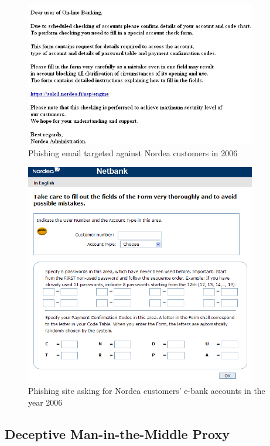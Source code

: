 \documentclass{tktltiki}
\begin{document}
          
\begin{figure}
  \centering
  \includegraphics[width=0.9\textwidth]{images/nordea_phishing_email.jpg}
  \caption{Phishing email targeted against Nordea customers in 2006}
  \label{fig:nordea_phishing_email}
\end{figure}

\begin{figure}
  \centering
  \includegraphics[width=0.9\textwidth]{images/nordea_phishing_website.png}
  \caption{Phishing site asking for Nordea customers' e-bank accounts in the year 2006}
  \label{fig:nordea_phishing_website}
\end{figure}

      
\subsection{Deceptive Man-in-the-Middle Proxy}
\end{document}
